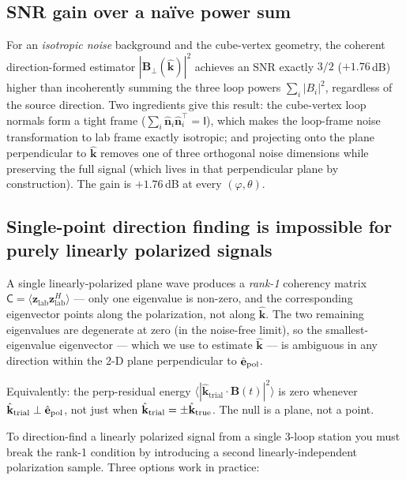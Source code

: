 \documentclass[11pt]{article}
\begin{document}
\subsection{SNR gain over a naïve power sum}

For an \emph{isotropic noise} background and the cube-vertex geometry,
the coherent direction-formed estimator $|\mathbf{B}_\perp(\hat{\mathbf k})|^2$
achieves an SNR exactly $3/2$ ($+1.76$\,dB) higher than incoherently
summing the three loop powers $\sum_i |B_i|^2$, regardless of the
source direction.  Two ingredients give this result: the cube-vertex
loop normals form a tight frame ($\sum_i \hat{\mathbf n}_i\hat{\mathbf n}_i^{\!\top}\!=\!\mathsf{I}$),
which makes the loop-frame noise transformation to lab frame exactly
isotropic; and projecting onto the plane perpendicular to $\hat{\mathbf k}$
removes one of three orthogonal noise dimensions while preserving the
full signal (which lives in that perpendicular plane by construction).
The gain is $+1.76$\,dB at every $(\varphi,\theta)$.

\subsection{Single-point direction finding is impossible for purely
linearly polarized signals}
\label{sec:rank1}

A single linearly-polarized plane wave produces a \emph{rank-1}
coherency matrix
$\mathsf{C} = \langle\mathbf{z}_{\mathrm{lab}}\mathbf{z}_{\mathrm{lab}}^H\rangle$
--- only one eigenvalue is non-zero, and the corresponding eigenvector
points along the polarization, not along $\hat{\mathbf k}$.  The two
remaining eigenvalues are degenerate at zero (in the noise-free
limit), so the smallest-eigenvalue eigenvector --- which we use to
estimate $\hat{\mathbf k}$ --- is ambiguous in any direction within
the 2-D plane perpendicular to $\hat{\mathbf{e}}_{\rm pol}$.

Equivalently: the perp-residual energy
$\langle |\hat{\mathbf k}_{\mathrm{trial}}\cdot\mathbf B(t)|^2\rangle$
is zero whenever $\hat{\mathbf k}_{\mathrm{trial}} \perp
\hat{\mathbf{e}}_{\rm pol}$, not just when $\hat{\mathbf k}_{\mathrm{trial}}
=\pm\hat{\mathbf k}_{\rm true}$.  The null is a plane, not a point.

To direction-find a linearly polarized signal from a single 3-loop
station you must break the rank-1 condition by introducing a second
linearly-independent polarization sample.  Three options work in
practice:
\end{document}
